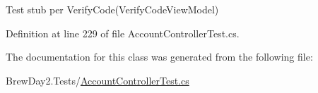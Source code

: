 Test stub per Verify\+Code(\+Verify\+Code\+View\+Model)



Definition at line 229 of file Account\+Controller\+Test.\+cs.



The documentation for this class was generated from the following file\+:\begin{DoxyCompactItemize}
\item 
Brew\+Day2.\+Tests/\mbox{\hyperlink{_account_controller_test_8cs}{Account\+Controller\+Test.\+cs}}\end{DoxyCompactItemize}
